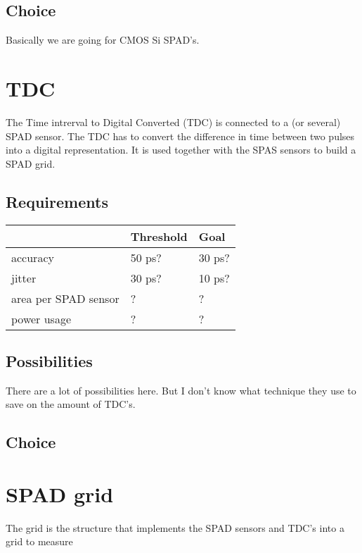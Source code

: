 \subsection{Choice} 
\label{ssec:sensor_choice}
Basically we are going for CMOS Si SPAD's.


\section{TDC} 
\label{sec:tdc}
The Time intrerval to Digital Converted (TDC) is connected to a (or several) SPAD sensor. The TDC has to convert the difference in time between two pulses into a digital representation. It is used together with the SPAS sensors to build a SPAD grid.

\subsection{Requirements} 
\label{ssec:tdc_req}

\begin{table}[H]
    \begin{tabular}{l|l|l}
    ~                    & Threshold & Goal   \\ \hline
    accuracy             & 50 ps?    & 30 ps? \\
    jitter               & 30 ps?    & 10 ps? \\
    area per SPAD sensor & ?         & ?      \\
    power usage          & ?         & ?      \\
    \end{tabular}
\end{table}

\subsection{Possibilities} 
\label{ssec:tdc_pos}
There are a lot of possibilities here. But I don't know what technique they use to save on the amount of TDC's.

\subsection{Choice} 
\label{ssec:tdc_choice}


\section{SPAD grid} 
\label{sec:spad_grid}
The grid is the structure that implements the SPAD sensors and TDC's into a grid to measure 

